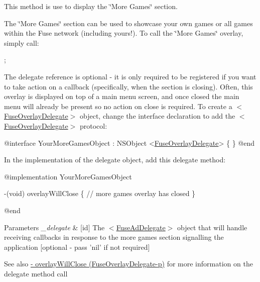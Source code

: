 This method is use to display the \char`\"{}\+More Games\char`\"{} section. 

The \char`\"{}\+More Games\char`\"{} section can be used to showcase your own games or all games within the Fuse network (including yours!). To call the \char`\"{}\+More Games\char`\"{} overlay, simply call\+:


\begin{DoxyCode}
;
\end{DoxyCode}


The delegate reference is optional -\/ it is only required to be registered if you want to take action on a callback (specifically, when the section is closing). Often, this overlay is displayed on top of a main menu screen, and once closed the main menu will already be present so no action on close is required. To create a $<$\hyperlink{protocol_fuse_overlay_delegate-p}{Fuse\+Overlay\+Delegate}$>$ object, change the interface declaration to add the $<$\hyperlink{protocol_fuse_overlay_delegate-p}{Fuse\+Overlay\+Delegate}$>$ protocol\+:


\begin{DoxyCode}
\textcolor{keyword}{@interface }YourMoreGamesObject : NSObject <\hyperlink{protocol_fuse_overlay_delegate-p}{FuseOverlayDelegate}> 
\{
\}
\textcolor{keyword}{@end}
\end{DoxyCode}


In the implementation of the delegate object, add this delegate method\+:


\begin{DoxyCode}
\textcolor{keyword}{@implementation }YourMoreGamesObject

-(void) overlayWillClose
\{
   \textcolor{comment}{// more games overlay has closed}
\}

\textcolor{keyword}{@end}
\end{DoxyCode}



\begin{DoxyParams}{Parameters}
{\em \+\_\+delegate} & \mbox{[}id\mbox{]} The $<$\hyperlink{protocol_fuse_ad_delegate-p}{Fuse\+Ad\+Delegate}$>$ object that will handle receiving callbacks in response to the more games section signalling the application \mbox{[}optional -\/ pass 'nil' if not required\mbox{]} \\
\hline
\end{DoxyParams}
\begin{DoxySeeAlso}{See also}
\hyperlink{protocol_fuse_overlay_delegate-p_a45f598193363390e2d50f9cec694be35}{-\/ overlay\+Will\+Close (\+Fuse\+Overlay\+Delegate-\/p)} for more information on the delegate method call 
\end{DoxySeeAlso}
\hypertarget{interface_fuse_a_p_i_a279e4cb8e95a3e78197761156a7de50d}{}
